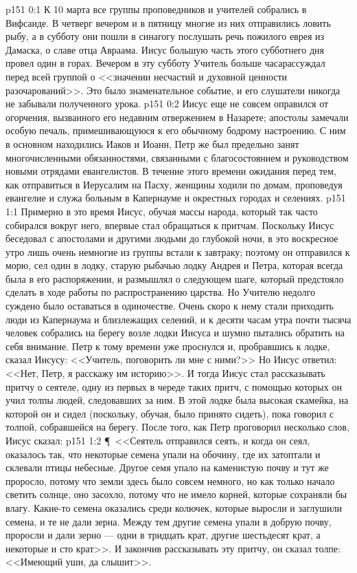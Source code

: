 \vs p151 0:1 К 10 марта все группы проповедников и учителей собрались в Вифсаиде. В четверг вечером и в пятницу многие из них отправились ловить рыбу, а в субботу они пошли в синагогу послушать речь пожилого еврея из Дамаска, о славе отца Авраама. Иисус большую часть этого субботнего дня провел один в горах. Вечером в эту субботу Учитель больше часарассуждал перед всей группой о <<значении несчастий и духовной ценности разочарований>>. Это было знаменательное событие, и его слушатели никогда не забывали полученного урока.
\vs p151 0:2 Иисус еще не совсем оправился от огорчения, вызванного его недавним отвержением в Назарете; апостолы замечали особую печаль, примешивающуюся к его обычному бодрому настроению. С ним в основном находились Иаков и Иоанн, Петр же был предельно занят многочисленными обязанностями, связанными с благосостоянием и руководством новыми отрядами евангелистов. В течение этого времени ожидания перед тем, как отправиться в Иерусалим на Пасху, женщины ходили по домам, проповедуя евангелие и служа больным в Капернауме и окрестных городах и селениях.
\vs p151 1:1 Примерно в это время Иисус, обучая массы народа, который так часто собирался вокруг него, впервые стал обращаться к притчам. Поскольку Иисус беседовал с апостолами и другими людьми до глубокой ночи, в это воскресное утро лишь очень немногие из группы встали к завтраку; поэтому он отправился к морю, сел один в лодку, старую рыбачью лодку Андрея и Петра, которая всегда была в его распоряжении, и размышлял о следующем шаге, который предстояло сделать в ходе работы по распространению царства. Но Учителю недолго суждено было оставаться в одиночестве. Очень скоро к нему стали приходить люди из Капернаума и близлежащих селений, и к десяти часам утра почти тысяча человек собрались на берегу возле лодки Иисуса и шумно пытались обратить на себя внимание. Петр к тому времени уже проснулся и, пробравшись к лодке, сказал Иисусу: <<Учитель, поговорить ли мне с ними?>> Но Иисус ответил: <<Нет, Петр, я расскажу им историю>>. И тогда Иисус стал рассказывать притчу о сеятеле, одну из первых в череде таких притч, с помощью которых он учил толпы людей, следовавших за ним. В этой лодке была высокая скамейка, на которой он и сидел (поскольку, обучая, было принято сидеть), пока говорил с толпой, собравшейся на берегу. После того, как Петр проговорил несколько слов, Иисус сказал:
\vs p151 1:2 \P\ <<Сеятель отправился сеять, и когда он сеял, оказалось так, что некоторые семена упали на обочину, где их затоптали и склевали птицы небесные. Другое семя упало на каменистую почву и тут же проросло, потому что земли здесь было совсем немного, но как только начало светить солнце, оно засохло, потому что не имело корней, которые сохраняли бы влагу. Какие\hyp{}то семена оказались среди колючек, которые выросли и заглушили семена, и те не дали зерна. Между тем другие семена упали в добрую почву, проросли и дали зерно --- одни в тридцать крат, другие шестьдесят крат, а некоторые и сто крат>>. И закончив рассказывать эту притчу, он сказал толпе: <<Имеющий уши, да слышит>>.
